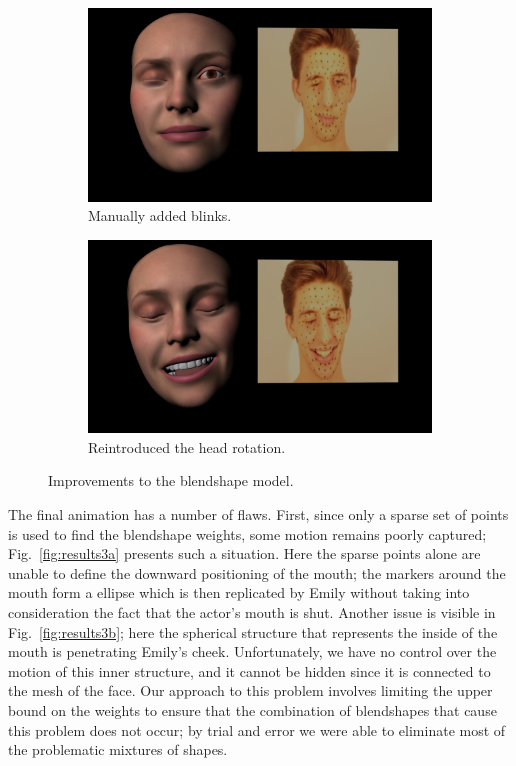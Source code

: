 \begin{figure}
        \centering
        \begin{subfigure}[t]{0.43\textwidth}
                \includegraphics[width=\textwidth]{img/results/Emily_Maya_clean_video_775}
                \caption{Manually added blinks.}\label{fig:results2a}
        \end{subfigure}
        \begin{subfigure}[t]{0.43\textwidth}
                \includegraphics[width=\textwidth]{img/results/Emily_Maya_clean_video_2941}
                \caption{Reintroduced the head rotation.}
        \end{subfigure}
        \caption{Improvements to the blendshape model.}\label{fig:results2b}
        \label{fig:results2}
\end{figure}

The final animation has a number of flaws. First, since only a sparse set of points is used to find the blendshape weights, some motion remains poorly captured; Fig.~\ref{fig:results3a} presents such a situation. Here the sparse points alone are unable to define the downward positioning of the mouth; the markers around the mouth form a ellipse which is then replicated by Emily without taking into consideration the fact that the actor's mouth is shut. Another issue is visible in Fig.~\ref{fig:results3b}; here the spherical structure that represents the inside of the mouth is penetrating Emily's cheek. Unfortunately, we have no control over the motion of this inner structure, and it cannot be hidden since it is connected to the mesh of the face. Our approach to this problem involves limiting the upper bound on the weights to ensure that the combination of blendshapes that cause this problem does not occur; by trial and error we were able to eliminate most of the problematic mixtures of shapes.

